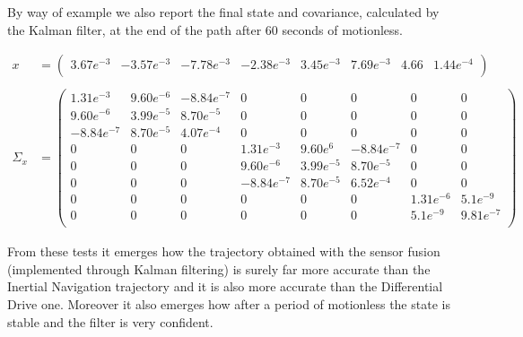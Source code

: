 \newpage
By way of example we also report the final state and covariance, calculated by the Kalman filter, at the end of the path after 60 seconds of motionless.
\begin{adjustwidth}{-0.6cm}{10pt}
	\begin{align}
		x &= \begin{pmatrix}
				3.67e^{-3} & -3.57e^{-3} & -7.78e^{-3} & -2.38e^{-3} & 3.45e^{-3} & 7.69e^{-3} & 4.66 & 1.44e^{-4}\\
				\end{pmatrix}\nonumber\\
		\nonumber\\
		\Sigma_x &= \begin{pmatrix}
					1.31e^{-3} & 9.60e^{-6} & -8.84e^{-7} & 0 & 0 & 0 & 0 & 0\\
					9.60e^{-6} & 3.99e^{-5} & 8.70e^{-5} & 0 & 0 & 0 & 0 & 0\\
					-8.84e^{-7} & 8.70e^{-5} & 4.07e^{-4} & 0 & 0 & 0 & 0 & 0\\
					0 & 0 & 0 & 1.31e^{-3} & 9.60e^{6} & -8.84e^{-7} & 0 & 0\\
					0 & 0 & 0 & 9.60e^{-6} & 3.99e^{-5} & 8.70e^{-5} & 0 & 0\\
					0 & 0 & 0 & -8.84e^{-7} & 8.70e^{-5} & 6.52e^{-4} & 0 & 0\\
					0 & 0 & 0 & 0 & 0 & 0 & 1.31e^{-6} & 5.1e^{-9}\\
					0 & 0 & 0 & 0 & 0 & 0 & 5.1e^{-9} & 9.81e^{-7}\\
				\end{pmatrix}\nonumber
	\end{align}
\end{adjustwidth}
\vspace{80pt}
From these tests it emerges how the trajectory obtained with the sensor fusion (implemented through Kalman filtering) is surely far more accurate than the Inertial Navigation trajectory and it is also more accurate than the Differential Drive one. Moreover it also emerges how after a period of motionless the state is stable and the filter is very confident.\\

